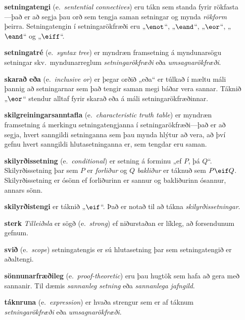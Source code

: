 \begin{enumerate}[leftmargin=35pt]
	\item[\textbf{setningatengi}] (e.\ \emph{sentential connectives}) eru tákn sem standa fyrir rökfasta---það er að segja þau orð sem tengja saman setningar og mynda \emph{rökform} þeirra. Setningatengin í setningarökfræði eru „$\enot$“, „$\eand$“, „$\eor$“, „$\eand$“ og „$\eiff$“.
	
	\item[\textbf{setningatré}] (e.\ \emph{syntax tree}) er myndræn framsetning á myndunarsögu setningar skv.\ myndunarreglum \emph{setningarökfræði} eða \emph{umsagnarökfræði}.
	
	\item[\textbf{skarað eða}] (e.\ \emph{inclusive or}) er þegar orðið „eða“ er túlkað í mæltu máli þannig að setningarnar sem það tengir saman megi báðar vera sannar. Táknið „$\eor$“ stendur alltaf fyrir skarað eða á máli setningarökfræðinnar.
		
	\item[\textbf{skilgreiningarsanntafla}]	(e.\ \emph{characteristic truth table}) er myndræn framsetning á merkingu setningatengjanna í setningarökfræði---það er að segja, hvert sanngildi setninganna sem þau mynda hlýtur að vera, að því gefnu hvert sanngildi hlutasetninganna er, sem tengdar eru saman.
	
	\item[\textbf{skilyrðissetning}] (e.\ \emph{conditional}) er setning á forminu „ef $P$, þá $Q$“. Skilyrðissetning þar sem $P$ er \emph{forliður} og $Q$ \emph{bakliður} er táknuð sem $P \eif Q$. Skilyrðissetning er ósönn ef forliðurinn er sannur og bakliðurinn ósannur, annars sönn.
		
	\item[\textbf{skilyrðistengi}] er táknið „$\eif$“. Það er notað til að tákna \emph{skilyrðissetningar}.
		
	\item[\textbf{sterk}] \emph{Tilleiðsla} er sögð  (e.\ \emph{strong}) ef niðurstaðan er líkleg, að forsendunum gefnum.
	
	\item[\textbf{svið}] (e.\ \emph{scope}) setningatengis er sú hlutasetning þar sem setningatengið er aðaltengi.
	
	\item[\textbf{sönnunarfræðileg}] (e.\ \emph{proof-theoretic}) eru þau hugtök sem hafa að gera með sannanir. Til dæmis \emph{sannanleg setning} eða \emph{sannanlega jafngild}.
	
	\item[\textbf{táknruna}] (e.\ \emph{expression}) er hvaða strengur sem er af táknum \emph{setningarökfræði} eða \emph{umsagnarökfræði}. 
	

\end{enumerate}
